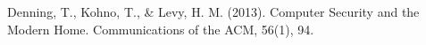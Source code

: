 \documentclass[journal]{IEEEtran}
\begin{document}
%
%
%
\begin{thebibliography}{1}

Denning, T., Kohno, T., \& Levy, H. M. (2013). Computer Security and the Modern Home. Communications of the ACM, 56(1), 94. 


\end{thebibliography}



\end{document}
